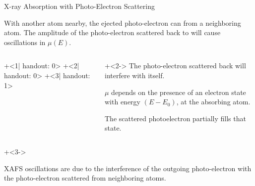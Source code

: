 \begin{slide}{X-ray Absorption with Photo-Electron Scattering}

  \Justify With another atom nearby, the ejected photo-electron can
  {} from a neighboring atom.  The amplitude of the
  photo-electron scattered back to {} will
  cause oscillations in $\mu(E)$.

    \vspace{3mm}

    \begin{columns}[T]
      \begin{column}{62mm}

        \begin{overprint}[62mm]
          \onslide+<1| handout: 0>  
          \onslide+<2| handout: 0> 
          \onslide+<3| handout: 1> 
        \end{overprint}
      \end{column}

      \begin{column}{44mm} \setlength{\baselineskip}{10pt}
          \justify

          {\onslide+<2->
            The photo-electron scattered back will interfere with itself.

            \vmm\vmm

            $\mu$ depends on the presence of an electron state with energy
            ${(E-E_0)}$, at the absorbing atom.

            \vmm\vmm

            The scattered photoelectron partially fills that state.
          }
      \end{column}
    \end{columns}

    \vspace{-2mm}

    {\onslide+<3->

    \begin{center}
      \begin{postitbox}{105mm}\Justify
        XAFS oscillations are due to the interference of the
        outgoing  photo-electron with the
        photo-electron scattered from neighboring atoms.
        \end{postitbox}
      \end{center}
    }

\vmm\vmm
\end{slide}
